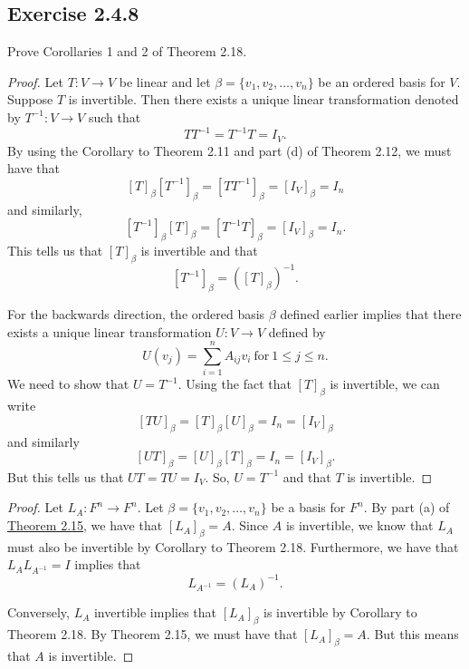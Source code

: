 \subsection*{Exercise 2.4.8} Prove Corollaries 1 and 2 of Theorem 2.18.
\begin{proof}
    Let \( T: V \to V  \) be linear and let \( \beta = \{ {v}_{1}, {v}_{2}, \dots, {v}_{n} \}   \) be an ordered basis for \( V  \). Suppose \( T  \) is invertible. Then there exists a unique linear transformation denoted by \( T^{-1}: V \to V  \) such that 
    \[
         TT^{-1} = T^{-1}T = {I}_{V}. 
    \]
    By using the Corollary to Theorem 2.11 and part (d) of Theorem 2.12, we must have that
    \[ [T]_{\beta} [T^{-1}]_{\beta} = [T T^{-1}]_{\beta} = [{I}_{V}]_{\beta} = {I}_{n}  \]
    and similarly,
    \[  [T^{-1}]_{\beta} [T]_{\beta} = [T^{-1} T]_{ \beta} = [{I}_{V}]_{\beta} = {I}_{n}. \]
    This tells us that \( [T]_{\beta}  \) is invertible and that 
    \[  [T^{-1}]_{\beta} = ([T]_{\beta})^{-1}. \]

   For the backwards direction, the ordered basis \( \beta \) defined earlier implies that there exists a unique linear transformation \( U: V \to V  \) defined by  
   \[  U({v}_{j}) = \sum_{ i=1  }^{ n } {A}_{ij} {v}_{i} \ \text{for} \ 1 \leq j \leq n. \]
   We need to show that \( U = T^{-1} \). Using the fact that \( [T]_{\beta} \) is invertible, we can write
   \[  [T U]_{\beta} = [T]_{\beta} [U]_{\beta} = {I}_{n} = [{I}_{V}]_{\beta}  \]
   and similarly
   \[  [UT]_{\beta} = [U]_{\beta} [T]_{\beta} = {I}_{n} = [{I}_{V}]_{\beta}.  \]
   But this tells us that \( UT = TU  = {I}_{V} \). So, \( U = T^{-1}  \) and that \( T \) is invertible.
\end{proof}

\begin{proof}
Let \( {L}_{A}: F^{n} \to F^{n} \). Let \( \beta = \{ {v}_{1}, {v}_{2}, \dots, {v}_{n} \}  \) be a basis for \( F^{n} \). By part (a) of {\hyperref[Prop of LMT]{Theorem 2.15}}, we have that \( [{L}_{A}]_{\beta} = A   \). Since \( A \) is invertible, we know that \( {L}_{A} \) must also be invertible by Corollary to Theorem 2.18. Furthermore, we have that \( {L}_{A} {L}_{A^{-1}} = I   \) implies that 
\[  {L}_{A^{-1}} = ({L}_{A})^{-1}.  \]

Conversely, \( {L}_{A} \) invertible implies that \( [{L}_{A}]_{\beta}  \) is invertible by Corollary to Theorem 2.18. By Theorem 2.15, we must have that \( [L_{A}]_{\beta}  = A  \). But this means that \( A  \) is invertible.
\end{proof}

